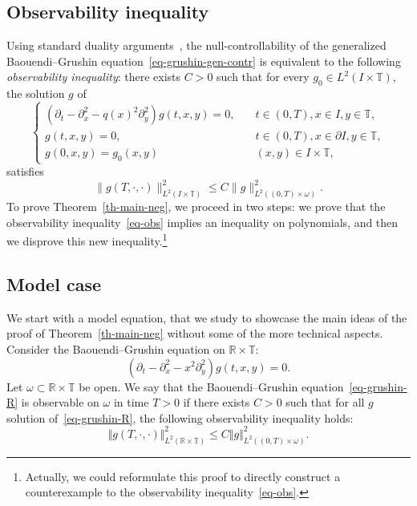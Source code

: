 \documentclass[AHL,Unicode,longabstracts,published]{cedram}
\renewcommand{\leq}{\leqslant}
\newcommand{\1}{\mathds 1}
\newcommand{\R}{\mathbb{R}}
\newcommand{\T}{\mathbb{T}}
\renewcommand{\o}{\omega}
\renewcommand{\o}{\omega}
\begin{document}
\break

\subsection{Observability inequality}
Using standard duality arguments~\cite[Theorem~2.44]{Coron07}, the null-controllability of the generalized Baouendi--Grushin equation~\eqref{eq-grushin-gen-contr} is equivalent to the following \emph{observability inequality}: there exists $C>0$ such that for every $g_0\in L^2(I\times \T)$, the solution $g$ of
\begin{equation}\label{eq-grushin-gen}
\left\{
\begin{array}{ll}
\left(\partial_t-\partial_x^2 - q(x)^2 \partial_y^2\right)g(t,x,y) = 0,&\quad t\in (0,T), x\in I, y\in \T,\\
g(t,x,y) = 0,&\quad t\in (0,T), x\in \partial I, y\in \T,\\
g(0,x,y) = g_0(x,y)&\quad (x,y) \in I\times \T,
\end{array}\right.
\end{equation}
satisfies
\begin{equation}\label{eq-obs}
\|g(T,\cdot,\cdot)\|_{L^2(I\times \T)}^2 \leq C \|g\|_{L^2((0,T)\times \o)}^2.
\end{equation}
To prove Theorem~\ref{th-main-neg}, we proceed in two steps: we prove that the observability inequality~\eqref{eq-obs} implies an inequality on polynomials, and then we disprove this new inequality.\footnote{Actually, we could reformulate this proof to directly construct a counterexample to the observability inequality~\eqref{eq-obs}.}


\subsection{Model case}

We start with a model equation, that we study to showcase the main ideas of the proof of Theorem~\ref{th-main-neg} without some of the more technical aspects. Consider the Baouendi--Grushin equation on $\R\times \T$:
\begin{equation}\label{eq-grushin-R}
\left(\partial_t -\partial_x^2 - x^2\partial_y^2\right)g(t,x,y) = 0.
\end{equation}
Let $\omega\subset \R \times \T$ be open. We say that the Baouendi--Grushin equation~\eqref{eq-grushin-R} is observable on $\o$ in time $T>0$ if there exists $C>0$ such that for all $g$ solution of~\eqref{eq-grushin-R}, the following observability inequality holds:
\begin{equation}\label{eq-obs-R}
\Vert g(T,\cdot,\cdot)\Vert^2_{L^2(\R\times \T)}
\leq C \Vert g\Vert_{L^2((0,T)\times \o)}^2.
\end{equation}
\end{document}
